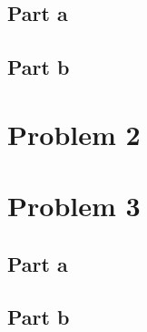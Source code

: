 \documentclass[11pt]{article}
\begin{document}
\subsection*{Part a}

\subsection*{Part b}

\section*{Problem 2}

\section*{Problem 3}
\subsection*{Part a}

\subsection*{Part b}
\end{document}
